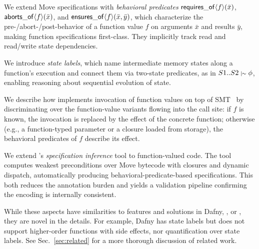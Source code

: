 \begin{Itemize}
    \item We extend Move specifications with \emph{behavioral predicates} $\mathop{\mathstrut{\mathsf{requires\_of}}}\nolimits\langle f\rangle(\bar{x})$, $\mathop{\mathstrut{\mathsf{aborts\_of}}}\nolimits\langle f\rangle(\bar{x})$, and $\mathop{\mathstrut{\mathsf{ensures\_of}}}\nolimits\langle f\rangle(\bar{x}, \bar{y})$, which characterize the pre-/abort-/post-behavior of a function value $f$ on arguments $\bar{x}$ and results $\bar{y}$, making function specifications first-class. They implicitly track read and read/write state dependencies.

    \item We introduce \emph{state labels}, which name intermediate memory states along a function's execution and connect them via two-state predicates, as in $S1..S2 \mathrel{{\scriptstyle\vert}\mkern-1mu{\scriptstyle\sim}} \phi$, enabling reasoning about sequential evolution of state.

    \item We describe how \MVP implements invocation of function values on top of SMT~\cite{SMTLib2010,z3} by discriminating over the function-value variants flowing into the call site: if $f$ is known, the invocation is replaced by the effect of the concrete function; otherwise (e.g., a function-typed parameter or a closure loaded from storage), the behavioral predicates of $f$ describe its effect.

    \item We extend \MVP's \emph{specification inference} tool \cite{GrieskampEtAl26Inf} to function-valued code.
    The tool computes weakest preconditions over Move bytecode with closures and dynamic dispatch, automatically producing behavioral-predicate-based specifications.
    This both reduces the annotation burden and yields a validation pipeline confirming the encoding is internally consistent.
\end{Itemize}

\noindent While these aspects have similarities to features and solutions in Dafny, \fstar, or \verus, they are novel in the details. For example, Dafny has state labels but does not support higher-order functions with side effects, nor quantification over state labels. See Sec.~\ref{sec:related} for a more thorough discussion of related work.


